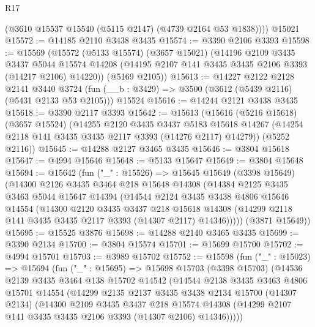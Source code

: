 \begin{lexlean}{R17}
\begin{coremodule}
        (@3610 @15537 @15540 (@5115 @2147) (@4739 @2164 @53 @1838))))
    @15021
@15572 := @14185 @2110 @3438 @3435
@15574 := @3390 @2106 @3393
@15598 := @15569
    (@15572
      (@5133 @15574)
      (@3657 @15021)
      (@14196
        @2109
        @3435
        @3437
        @5044
        @15574
        @14208
        (@14195 @2107 @141 @3435 @3435 @2106 @3393 (@14217 @2106) @14220))
      (@5169 @2105))
@15613 := @14227
    @2122
    @2128
    @2141
    @3440
    @3724
    (fun (__b : @3429) => @3500 (@3612 (@5439 @2116) (@5431 @2133 @53 @2105)))
    @15524
@15616 := @14244 @2121 @3438 @3435
@15618 := @3390 @2117 @3393
@15642 := @15613
    (@15616
      (@5216 @15618)
      (@3657 @15524)
      (@14255
        @2120
        @3435
        @3437
        @5183
        @15618
        @14267
        (@14254 @2118 @141 @3435 @3435 @2117 @3393 (@14276 @2117) @14279))
      (@5252 @2116))
@15645 := @14288 @2127 @3465 @3435
@15646 := @3804 @15618
@15647 := @4994 @15646
@15648 := @5133 @15647
@15649 := @3804 @15648
@15694 := @15642
    (fun ("_" : @15526) =>
    @15645
      @15649
      (@3398 @15649)
      (@14300
        @2126
        @3435
        @3464
        @218
        @15648
        @14308
        (@14384
          @2125
          @3435
          @3463
          @5044
          @15647
          @14394
          (@14544
            @2124
            @3435
            @3438
            @4806
            @15646
            @14554
            (@14300
              @2120
              @3435
              @3437
              @218
              @15618
              @14308
              (@14299 @2118 @141 @3435 @3435 @2117 @3393 (@14307 @2117) @14346)))))
      (@3871 @15649))
@15695 := @15525 @3876
@15698 := @14288 @2140 @3465 @3435
@15699 := @3390 @2134
@15700 := @3804 @15574
@15701 := @15699 @15700
@15702 := @4994 @15701
@15703 := @3989 @15702
@15752 := @15598
    (fun ("_" : @15023) =>
    @15694
      (fun ("_" : @15695) =>
      @15698
        @15703
        (@3398 @15703)
        (@14536
          @2139
          @3435
          @3464
          @138
          @15702
          @14542
          (@14544
            @2138
            @3435
            @3463
            @4806
            @15701
            @14554
            (@14299
              @2135
              @2137
              @3435
              @3438
              @2134
              @15700
              (@14307 @2134)
              (@14300
                @2109
                @3435
                @3437
                @218
                @15574
                @14308
                (@14299 @2107 @141 @3435 @3435 @2106 @3393 (@14307 @2106) @14346)))))

\end{coremodule}
\end{lexlean}
